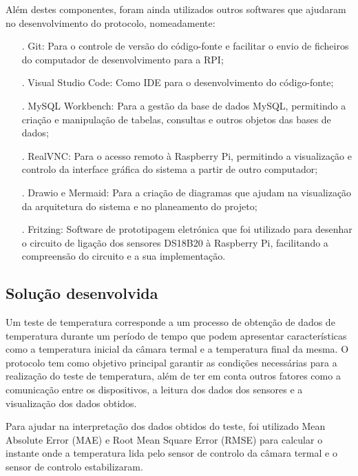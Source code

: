 Além destes componentes, foram ainda utilizados outros softwares que ajudaram no desenvolvimento do
protocolo, nomeadamente:
\begin{itemize}
    \item[.] Git: Para o controle de versão do código-fonte e facilitar o envio de ficheiros do computador de desenvolvimento para a RPI;
    \item[.] Visual Studio Code: Como IDE para o desenvolvimento do código-fonte;
    \item[.] MySQL Workbench: Para a gestão da base de dados MySQL, permitindo a criação e 
    manipulação de tabelas, consultas e outros objetos das bases de dados;
    \item[.] RealVNC: Para o acesso remoto à Raspberry Pi, permitindo a visualização e controlo da 
    interface gráfica do sistema a partir de outro computador;
    \item[.] Drawio e Mermaid: Para a criação de diagramas que ajudam na visualização da 
    arquitetura do sistema e no planeamento do projeto;
    \item[.] Fritzing: Software de prototipagem eletrónica que foi utilizado para desenhar o circuito de ligação dos sensores DS18B20 à Raspberry Pi,
    facilitando a compreensão do circuito e a sua implementação.
\end{itemize}

\subsection{Solução desenvolvida}

Um teste de temperatura corresponde a um processo de obtenção de dados de temperatura durante um período de tempo
que podem apresentar características como a temperatura inicial da câmara termal e a temperatura final da mesma. 
O protocolo tem como objetivo principal garantir as condições necessárias para a realização do teste de temperatura,
além de ter em conta outros fatores como a comunicação entre os dispositivos, a leitura dos dados dos sensores e a 
visualização dos dados obtidos.

Para ajudar na interpretação dos dados obtidos do teste, foi utilizado Mean Absolute Error (MAE) e Root Mean Square Error (RMSE)
para calcular o instante onde a temperatura lida pelo sensor de controlo da câmara termal e o sensor de controlo estabilizaram.

